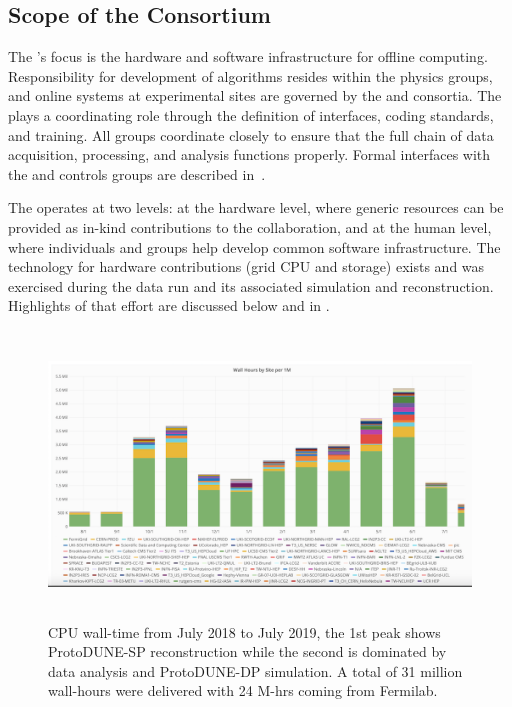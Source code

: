 \subsection{Scope of the Consortium}
The 's focus is the hardware and software infrastructure  for offline computing.  Responsibility for development of algorithms  resides within the physics groups, %
and online systems at experimental sites are governed by the  and  consortia. The  plays a coordinating role through the definition of interfaces, coding standards, and training. All groups coordinate closely to ensure that the full chain of data acquisition, processing, and analysis %
functions properly. Formal interfaces with the  and controls groups are described in~\cite{bib:docdb7123,bib:docdb7126}. %

The  operates at two levels: at the hardware level, where generic resources can be provided as in-kind contributions to the collaboration, and at the human level, where individuals and groups help develop common software infrastructure.  The   technology for hardware contributions (grid CPU and storage) exists and was exercised during the  data run and its associated %
simulation and reconstruction. Highlights of that effort are discussed below and in \physchtools{}. %



\begin{figure}[htp]
\centering
\includegraphics[height=3in]{graphics/comp-ComputingLastYear.png}
\caption[CPU wall-time from July 2018 to July 2019]{CPU wall-time from July 2018 to July 2019, the 1st peak shows  ProtoDUNE-SP reconstruction while the second is dominated by data analysis and ProtoDUNE-DP simulation. A total of 31 million wall-hours were delivered with 24 M-hrs coming from Fermilab.  }
\label{fig:ch-exec-comp-cpupie-es}
\end{figure}


